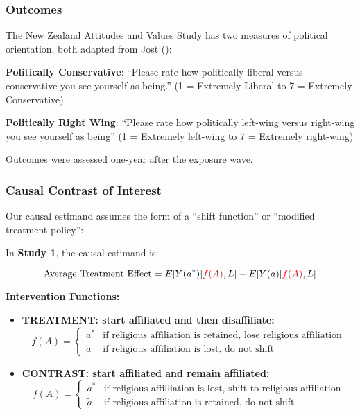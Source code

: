 \documentclass[
  singlecolumn]{article}
\begin{document}
\subsubsection{Outcomes}\label{outcomes}

The New Zealand Attitudes and Values Study has two measures of political
orientation, both adapted from Jost
():

\textbf{Politically Conservative}: ``Please rate how politically liberal
versus conservative you see yourself as being.'' (1 = Extremely Liberal
to 7 = Extremely Conservative)

\textbf{Politically Right Wing}: ``Please rate how politically left-wing
versus right-wing you see yourself as being'' (1 = Extremely left-wing
to 7 = Extremely right-wing)

Outcomes were assessed one-year after the exposure wave.

\subsubsection{Causal Contrast of
Interest}\label{causal-contrast-of-interest}

Our causal estimand assumes the form of a ``shift function'' or
``modified treatment policy'':

In \textbf{Study 1}, the causal estimand is:

\[ \text{Average Treatment Effect} = E[Y(a^*)|\textcolor{red}{f(A)},L] -  E[Y(a)|\textcolor{red}{f(A)},L] \]

\textbf{Intervention Functions:}

\begin{itemize}
\item
  \textbf{TREATMENT: start affiliated and then disaffiliate:} \[
   f(A) = \begin{cases} a^* & \text{if religious affiliation is retained, lose religious affiliation} \\ 
   \tilde{a} & \text{if religious affiliation is lost, do not shift} \end{cases}
   \]
\item
  \textbf{CONTRAST: start affiliated and remain affiliated:} \[
   f(A) = \begin{cases} a^* & \text{if religious affilliation is lost, shift to religious affiliation} \\ 
   \tilde{a} & \text{if religious affiliation is retained, do not shift} \end{cases}
   \]
\end{itemize}
\end{document}
